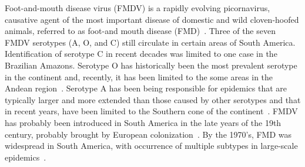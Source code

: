 \documentclass[10pt]{article}
\begin{document}
Foot-and-mouth disease virus (FMDV) is a rapidly evolving picornavirus, causative agent of the most important disease of domestic and wild cloven-hoofed animals, referred to as foot-and mouth disease (FMD)~\cite{review}.
Three of the seven FMDV serotypes (A, O, and C) still circulate in certain areas of South America.
Identification of serotype C in recent decades was limited to one case in the Brazilian Amazons.
Serotype O has historically been the most prevalent serotype in the continent and, recently, it has been limited to the  some areas in the Andean region~\cite{andean}.
Serotype A has been being responsible for epidemics that are typically larger and more extended than those caused by other serotypes and that in recent years, have been limited to the Southern cone of the continent~\cite{Perez2001,Malirat2012}.
FMDV has probably been introduced in South America in the late years of the 19th century, probably brought by European colonization~\cite{tully}. 
By the 1970's, FMD was widespread in South America, with occurrence of multiple subtypes in large-scale epidemics~\cite{Saraiva2003}.

\end{document}
